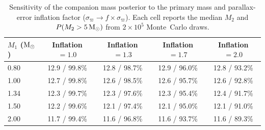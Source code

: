 \documentclass[usenatbib,fleqn]{mnras}
\newcommand{\Msun}{{\rm M}_\odot}
\begin{document}
\begin{table}
\centering
\caption{Sensitivity of the companion mass posterior to the primary
mass and parallax-error inflation factor
($\sigma_\varpi \to f \times \sigma_\varpi$).
Each cell reports the median $M_2$ and $P(M_2 > 5\,\Msun)$
from $2 \times 10^5$ Monte~Carlo draws.}
\label{tab:sensitivity}
\begin{tabular}{lcccc}
\toprule
$M_1$ ($\Msun$) & Inflation $= 1.0$ & Inflation $= 1.3$ &
Inflation $= 1.7$ & Inflation $= 2.0$ \\
\midrule
0.80 & 12.9 / 99.8\% & 12.8 / 98.7\% & 12.9 / 96.0\% & 12.8 / 93.2\% \\
1.00 & 12.7 / 99.8\% & 12.6 / 98.5\% & 12.6 / 95.7\% & 12.6 / 92.8\% \\
1.34 & 12.3 / 99.7\% & 12.3 / 97.6\% & 12.3 / 95.4\% & 12.4 / 91.7\% \\
1.50 & 12.2 / 99.6\% & 12.1 / 97.4\% & 12.1 / 95.0\% & 12.1 / 91.0\% \\
2.00 & 11.7 / 99.4\% & 11.6 / 96.8\% & 11.6 / 93.7\% & 11.6 / 89.3\% \\
\bottomrule
\end{tabular}
\end{table}
\end{document}
